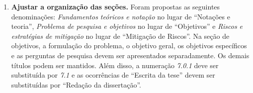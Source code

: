 \documentclass[11pt,a4paper]{article}
\theoremstyle{definition}
\begin{document}
\begin{enumerate}
  \item \textbf{Ajustar a organização das seções.} Foram propostas as
  seguintes denominações: \emph{Fundamentos teóricos e notação} no lugar de
  “Notações e teoria”, \emph{Problema de pesquisa e objetivos} no lugar de
  “Objetivos” e \emph{Riscos e estratégias de mitigação} no lugar de
  “Mitigação de Riscos”. Na seção de objetivos, a formulação do problema, o
  objetivo geral, os objetivos específicos e as perguntas de pesquisa devem ser
  apresentados separadamente. Os demais títulos podem ser mantidos. Além disso,
  a numeração \emph{7.0.1} deve ser substituída por \emph{7.1} e as ocorrências
  de “Escrita da tese” devem ser substituídas por “Redação da dissertação”.
\end{enumerate}



\end{document}
